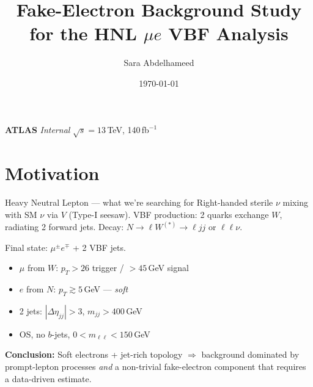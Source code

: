 \documentclass[10pt,aspectratio=169]{beamer}
\title[Fake $e$ — HNL $\mu e$ VBF]{Fake-Electron Background Study\\for the HNL $\mu e$ VBF Analysis}
\author{Sara Abdelhameed}
\institute{CERN — ATLAS Collaboration}
\date{\today}
\newcommand{\concl}[1]{%
  \begin{tcolorbox}[colback=conclbg,colframe=conclbord,arc=1.5mm,boxrule=0.6pt,
                    left=1mm,right=1mm,top=0.5mm,bottom=0.5mm]
  \footnotesize\textbf{Conclusion:} #1
  \end{tcolorbox}}
\begin{document}
\begin{frame}
  \titlepage
  \vfill
  \centering \scriptsize \textbf{ATLAS} \emph{Internal} \quad $\sqrt{s}=13$\,TeV, 140\,fb$^{-1}$
\end{frame}

\section{Motivation}

\begin{frame}{Heavy Neutral Lepton — what we're searching for}
  \footnotesize
  Right-handed sterile $\nu$ mixing with SM $\nu$ via $V$ (Type-I seesaw).
  VBF production: 2 quarks exchange $W$, radiating 2 forward jets.
  Decay: $N\!\to\!\ell W^{(\ast)}\!\to\!\ell jj$ or $\ell\ell\nu$.

  \vspace{1mm}
  Final state: $\mu^{\pm} e^{\mp}$ + 2 VBF jets.
  \begin{itemize}\setlength{\itemsep}{0pt}\footnotesize
    \item $\mu$ from $W$: $p_T>26$ trigger / $>45$\,GeV signal
    \item $e$ from $N$: $p_T \gtrsim 5$\,GeV — \emph{soft}
    \item 2 jets: $|\Delta\eta_{jj}|>3$, $m_{jj}>400$\,GeV
    \item OS, no $b$-jets, $0<m_{\ell\ell}<150$\,GeV
  \end{itemize}

  \concl{Soft electrons + jet-rich topology $\Rightarrow$ background dominated
  by prompt-lepton processes \emph{and} a non-trivial fake-electron component
  that requires a data-driven estimate.}
\end{frame}
\end{document}
